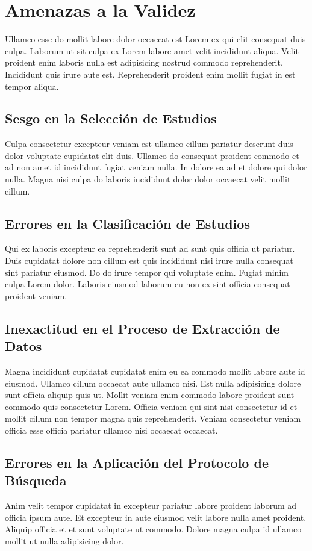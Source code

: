 \section{Amenazas a la Validez}\label{sec:amenazas-validez}
Ullamco esse do mollit labore dolor occaecat est Lorem ex qui elit consequat duis culpa. Laborum ut sit culpa ex Lorem labore amet velit incididunt aliqua. Velit proident enim laboris nulla est adipisicing nostrud commodo reprehenderit. Incididunt quis irure aute est. Reprehenderit proident enim mollit fugiat in est tempor aliqua.


\subsection{Sesgo en la Selección de Estudios}
Culpa consectetur excepteur veniam est ullamco cillum pariatur deserunt duis dolor voluptate cupidatat elit duis. Ullamco do consequat proident commodo et ad non amet id incididunt fugiat veniam nulla. In dolore ea ad et dolore qui dolor nulla. Magna nisi culpa do laboris incididunt dolor dolor occaecat velit mollit cillum.

\subsection{Errores en la Clasificación de Estudios}
Qui ex laboris excepteur ea reprehenderit sunt ad sunt quis officia ut pariatur. Duis cupidatat dolore non cillum est quis incididunt nisi irure nulla consequat sint pariatur eiusmod. Do do irure tempor qui voluptate enim. Fugiat minim culpa Lorem dolor. Laboris eiusmod laborum eu non ex sint officia consequat proident veniam.
    
\subsection{Inexactitud en el Proceso de Extracción de Datos}
Magna incididunt cupidatat cupidatat enim eu ea commodo mollit labore aute id eiusmod. Ullamco cillum occaecat aute ullamco nisi. Est nulla adipisicing dolore sunt officia aliquip quis ut. Mollit veniam enim commodo labore proident sunt commodo quis consectetur Lorem. Officia veniam qui sint nisi consectetur id et mollit cillum non tempor magna quis reprehenderit. Veniam consectetur veniam officia esse officia pariatur ullamco nisi occaecat occaecat.

\subsection{Errores en la Aplicación del Protocolo de Búsqueda}
Anim velit tempor cupidatat in excepteur pariatur labore proident laborum ad officia ipsum aute. Et excepteur in aute eiusmod velit labore nulla amet proident. Aliquip officia et et sunt voluptate ut commodo. Dolore magna culpa id ullamco mollit ut nulla adipisicing dolor.

